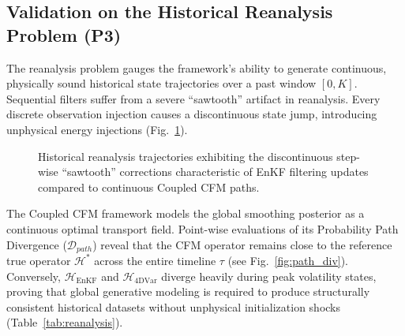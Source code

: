 \documentclass[10pt]{article}
\begin{document}
\subsection{Validation on the Historical Reanalysis Problem (P3)}
The reanalysis problem gauges the framework’s ability to generate continuous, physically sound historical state trajectories over a past window $[0, K]$. Sequential filters suffer from a severe ``sawtooth'' artifact in reanalysis. Every discrete observation injection causes a discontinuous state jump, introducing unphysical energy injections (Fig.~\ref{fig:reanalysis_phase}).

\begin{figure}[!ht]
\centering
{}
\caption{Historical reanalysis trajectories exhibiting the discontinuous step-wise ``sawtooth'' corrections characteristic of EnKF filtering updates compared to continuous Coupled CFM paths.}
\label{fig:reanalysis_phase}
\end{figure}

The Coupled CFM framework models the global smoothing posterior as a continuous optimal transport field. Point-wise evaluations of its Probability Path Divergence ($\mathcal{D}_{path}$) reveal that the CFM operator remains close to the reference true operator $\mathcal{H}^*$ across the entire timeline $\tau$ (see Fig.~\ref{fig:path_div}). Conversely, $\mathcal{H}_{\text{EnKF}}$ and $\mathcal{H}_{\text{4DVar}}$ diverge heavily during peak volatility states, proving that global generative modeling is required to produce structurally consistent historical datasets without unphysical initialization shocks (Table~\ref{tab:reanalysis}).
\end{document}
